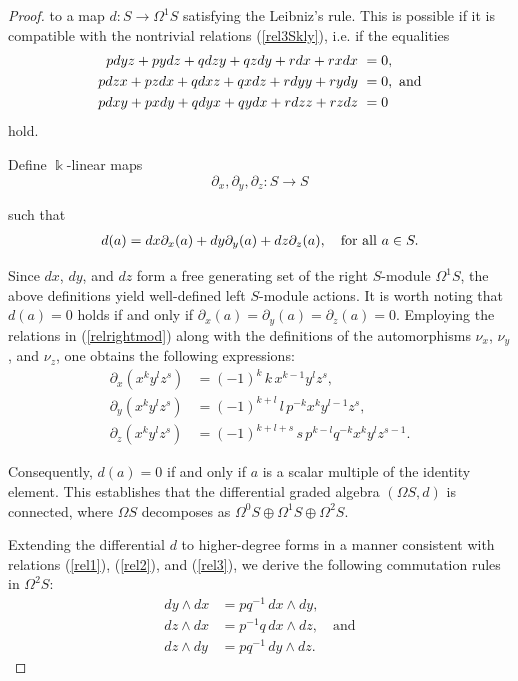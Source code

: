 \documentclass{amsart}
\theoremstyle{definition}
\theoremstyle{remark}
\numberwithin{equation}{section}
\begin{document}
\begin{proof}
to a map $d: S \to \Omega^{1} S$ satisfying the Leibniz's rule. This is possible if it is compatible with the nontrivial relations {\rm (}\ref{rel3Skly}{\rm )}, i.e. if the equalities
\begin{align*}
        pdyz+pydz + qdzy+qzdy + rdx+rxdx  &\ = 0, \\
        pdzx+pzdx + qdxz +qxdz+ rdyy+rydy &\ = 0,\ {\rm and} \\
        pdxy+pxdy + qdyx+qydx + rdzz+rzdz &\ = 0
\end{align*}
hold.

Define $\Bbbk$-linear maps 
\begin{equation*}
\partial_{x}, \partial_{y}, \partial_{z}: S \rightarrow S
\end{equation*}

such that
\begin{align*}
    d(a)=dx\partial_{x}(a)+dy\partial_{y}(a)+dz\partial_{z}(a), \quad {\rm for\ all} \ a \in S.
\end{align*}

Since $dx$, $dy$, and $dz$ form a free generating set of the right $S$-module $\Omega^1S$, the above definitions yield well-defined left $S$-module actions. It is worth noting that $d(a) = 0$ holds if and only if $\partial_x(a) = \partial_y(a) = \partial_z(a) = 0$. Employing the relations in {\rm (}\ref{relrightmod}{\rm )} along with the definitions of the automorphisms $\nu_x$, $\nu_y$, and $\nu_z$, one obtains the following expressions:
\begin{align*}
\partial_{x}(x^k y^l z^s) &= (-1)^k\,k\,x^{k-1} y^l z^s,  \\
\partial_{y}(x^k y^l z^s) &= (-1)^{k+l}\,l\,p^{-k} x^k y^{l-1} z^s,  \\
\partial_{z}(x^k y^l z^s) &= (-1)^{k+l+s}\,s\,p^{k-l} q^{-k} x^k y^l z^{s-1}.
\end{align*}


Consequently, $d(a) = 0$ if and only if $a$ is a scalar multiple of the identity element. This establishes that the differential graded algebra $(\Omega S, d)$ is connected, where $\Omega S$ decomposes as $\Omega^0 S \oplus \Omega^1 S \oplus \Omega^2 S$.

Extending the differential $d$ to higher-degree forms in a manner consistent with relations {\rm (}\ref{rel1}{\rm )}, {\rm (}\ref{rel2}{\rm )}, and {\rm (}\ref{rel3}{\rm )}, we derive the following commutation rules in $\Omega^2 S$:
\begin{align}
dy \wedge dx &= pq^{-1}\,dx \wedge dy, \\
dz \wedge dx &= p^{-1}q\,dx \wedge dz, \quad \text{and} \\
dz \wedge dy &= pq^{-1}\,dy \wedge dz. \label{relsecondD1}
\end{align}


\end{proof}
\end{document}
